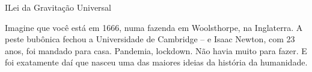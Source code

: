 \begin{secnivel}{I}{Lei da Gravitação Universal}
  

\end{secnivel}





Imagine que você está em 1666, numa fazenda em Woolsthorpe, na
Inglaterra. A peste bubônica fechou a Universidade de Cambridge -- e
Isaac Newton, com 23 anos, foi mandado para casa. Pandemia, lockdown. Não havia muito para
fazer. E foi exatamente daí que nasceu uma das maiores ideias da história da humanidade.







